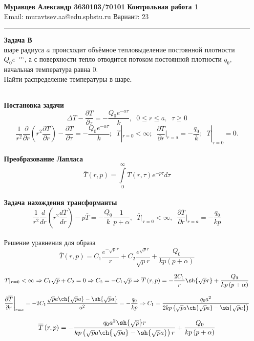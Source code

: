 \documentclass[a4paper, 11pt]{article}
\newcommand{\T}[0]{\overline{T}}
\newenvironment{problem}[2][Problem]
    { \begin{mdframed}[backgroundcolor=gray!20] \textbf{#1 #2} \\}
    {  \end{mdframed}}
\newenvironment{solution}
    {\textit{}}
    {}
\begin{document}
\large\textbf{Муравцев Александр 3630103/70101} \hfill \textbf{Контрольная работа 1}   \\
Email: muravtsev.aa@edu.spbstu.ru \hfill Вариант: 23 \\
\rule{7in}{2.8pt}

\begin{problem}[Задача]{23}
 В шаре радиуса $a$ происходит объёмное тепловыделение постоянной плотности $Q_0e^{-\alpha\tau}$, а с поверхности тепло отводится потоком постоянной плотности $q_0$, начальная температура равна $0$.\\ Найти распределение температуры в шаре.
\end{problem}


\begin{solution}\\
\textbf{Постановка задачи}
	$$\Delta T-\frac{\partial T}{\partial\tau}=-\frac{Q_0e^{-\alpha\tau}}{k},\;\;0\leq r\leq a,\;\;\tau\geq 0$$
	$$\frac{1}{r^2}\frac{\partial}{\partial r}\left(r^2\frac{\partial T}{\partial r}\right)-\frac{\partial T}{\partial\tau}=-\frac{Q_0e^{-\alpha\tau}}{k};\;\;T|_{r=0}<\infty;\;\;\frac{\partial T}{\partial r}\bigg|_{r=a}=-\frac{q_0}{k};\;\;T|_{\tau=0}=0.$$\\
\textbf{Преобразование Лапласа}
	$$\overline{T}\left(r,p\right)=\int\limits_{0}^{\infty}T\left(r,\tau\right)e^{-p\tau}d\tau$$\\
\textbf{Задача нахождения трансформанты}
	$$\frac{1}{r^2}\frac{d}{dr}\left(r^2\frac{d\overline{T}}{dr}\right)-p\overline{T}=-\frac{Q_0}{k}\frac{1}{p+\alpha},\;\;\overline{T}|_{r=0}<\infty,\;\;\frac{\partial\overline{T}}{\partial r}\bigg|_{r=a}=-\frac{q_0}{kp}$$\\
	Решение уравнения для образа$$\T\left(r,p\right)=C_1\frac{e^{-\sqrt{p}r}}{r}+C_2\frac{e^{\sqrt{p}r}}{\sqrt{p}r}+\frac{Q_0}{kp\left(p+\alpha\right)}$$
	
	
	$$T|_{r=0}<\infty\Rightarrow C_1\sqrt{p}+C_2=0\Rightarrow C_2=-C_1\sqrt{p}\Rightarrow\overline{T}\left(r,p\right)=-\frac{2C_1}{r}\sh{\sqrt{p}r}+\frac{Q_0}{kp\left(p+\alpha\right)}$$
	
	
	$$\frac{\partial\overline{T}}{\partial r}\bigg|_{r=a}=-2C_1\frac{\sqrt{p}a\ch{\sqrt{p}a}-\sh{\sqrt{p}a}}{a^2}=-\frac{q_0}{kp}\Rightarrow C_1=\frac{q_0a^2}{2kp\left(\sqrt{p}a\ch{\sqrt{p}a}-\sh{\sqrt{p}a}\right)}$$
	
	
	$$\overline{T}\left(r,p\right)=-\frac{q_0a^2\sh{\sqrt{p}}r}{kp\left(\sqrt{p}a\ch{\sqrt{p}a}-\sh{\sqrt{p}a}\right)r}+\frac{Q_0}{kp\left(p+\alpha\right)}$$
	

\end{solution}
\end{document}

